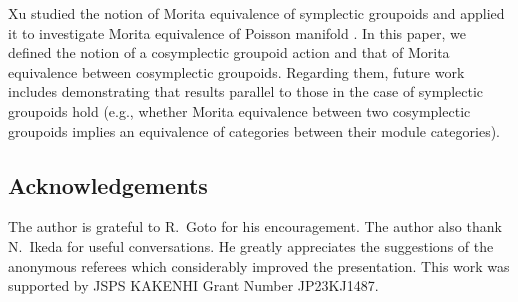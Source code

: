 \documentclass[10pt,a4paper]{amsart}
\numberwithin{equation}{section}
\begin{document}
Xu \cite{xu2} studied the notion of Morita equivalence of symplectic groupoids and applied it to investigate Morita equivalence of Poisson manifold \cite{xu1}. In this paper, we defined the notion of a cosymplectic groupoid action and that of Morita equivalence between cosymplectic groupoids. Regarding them, future work includes demonstrating that results parallel to those in the case of symplectic groupoids hold (e.g., whether Morita equivalence between two cosymplectic groupoids implies an equivalence of categories between their module categories).

\subsection*{Acknowledgements}

The author is grateful to R.~Goto for his encouragement. The author also thank N.~Ikeda for useful conversations. He greatly appreciates the suggestions of the anonymous referees which considerably improved the presentation. This work was supported by JSPS KAKENHI Grant Number JP23KJ1487.

\end{document}
